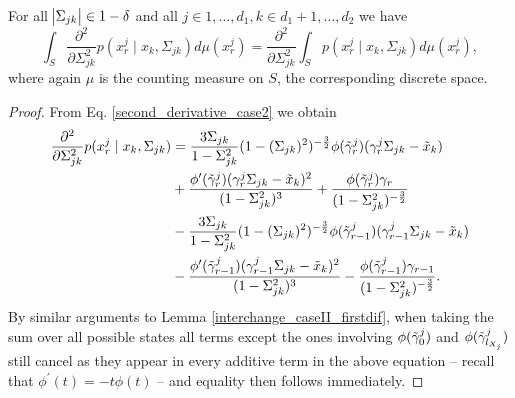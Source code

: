 \begin{corollary}
    For all $\abs{\Sigma_{jk}} \in 1-\delta$ and all $j \in 1, \dots, d_1, k\in d_1 +1, \dots, d_2$ we have
    \begin{equation*}
        \int_S \frac{\partial^2 }{\partial \Sigma_{jk}^2} p(x^j_{r} \mid x_{k}, \Sigma_{jk}) d\mu(x_r^j)= \frac{\partial^2}{\partial \Sigma_{jk}^2} \int_S p(x^j_{r} \mid x_{k}, \Sigma_{jk}) d\mu(x_r^j),
    \end{equation*}
    where again $\mu$ is the counting measure on $S$, the corresponding discrete space.
    
    \begin{proof}
        From Eq. \eqref{second_derivative_case2} we obtain 
        \begin{equation*}
            \begin{split}
                \frac{\partial^2 }{\partial \Sigma_{jk}^2} p(x^j_{r} \mid x_{k}, \Sigma_{jk}) 
                &= \frac{3\Sigma_{jk}}{1-\Sigma_{jk}^2} (1-(\Sigma_{jk})^2)^{-\frac{3}{2}} \phi({\Tilde{\gamma}}^j_{r})({\gamma}^j_r\Sigma_{jk} - {\Tilde{x}}_{k}) \\
                &+\frac{\phi^\prime({\Tilde{\gamma}}^j_{r})({\gamma}^j_r\Sigma_{jk} - {\Tilde{x}}_{k})^2}{(1-\Sigma_{jk}^2)^3} + \frac{\phi({\Tilde{\gamma}}^j_{r}){\gamma}_{r}}{(1-\Sigma_{jk}^2)^{-\frac{3}{2}}} \\
                &- \frac{3\Sigma_{jk}}{1-\Sigma_{jk}^2} (1-(\Sigma_{jk})^2)^{-\frac{3}{2}} \phi({\Tilde{\gamma}}^j_{r-1})({\gamma}^j_{r-1}\Sigma_{jk} - {\Tilde{x}}_{k}) \\
                &- \frac{\phi^\prime({\Tilde{\gamma}}^j_{r-1})({\gamma}^j_{r-1}\Sigma_{jk} - {\Tilde{x}}_{k})^2}{(1-\Sigma_{jk}^2)^3} - \frac{\phi({\Tilde{\gamma}}^j_{r-1}){\gamma}_{r-1}}{(1-\Sigma_{jk}^2)^{-\frac{3}{2}}}.
            \end{split}
        \end{equation*}
        By similar arguments to Lemma \ref{interchange_caseII_firstdif}, when taking the sum over all possible states all terms except the ones involving $\phi({\Tilde{\gamma}}^j_{0})$ and $\phi({\Tilde{\gamma}}^j_{l_{X_j}})$ still cancel as they appear in every additive term in the above equation -- recall that $\phi^\prime(t) = -t\phi(t)$ -- and equality then follows immediately. 
    \end{proof}
\end{corollary}    



